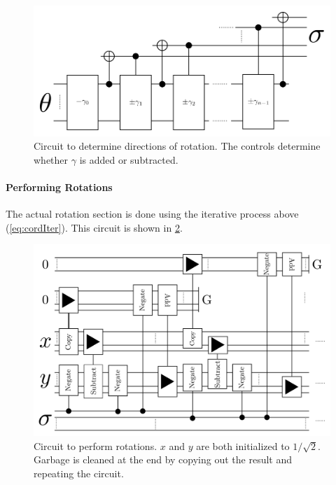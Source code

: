 	\begin{figure} 
            \capstart 
            \centering
	    \includegraphics[width=\textwidth]{images/CORDICDirections} 

	    \caption{Circuit to determine directions of rotation.  The controls
            determine whether $\gamma$ is added or subtracted.}
            \label{fig:CORDICDirections} 

        \end{figure}

        \paragraph{Performing Rotations}

            The actual rotation section is done using the iterative process
            above (\cref{eq:cordIter}). This circuit is shown in
            \cref{fig:CORDICRotations}.

            \begin{figure}
                \capstart
                \centering
                \includegraphics[width=\textwidth]{images/CORDICRotations}
                \caption{Circuit to perform rotations.
                         $x$ and $y$ are both initialized to $1/\sqrt{2}$.
                         Garbage is cleaned at the end by copying out the result and repeating the circuit.}
                \label{fig:CORDICRotations}
            \end{figure}
